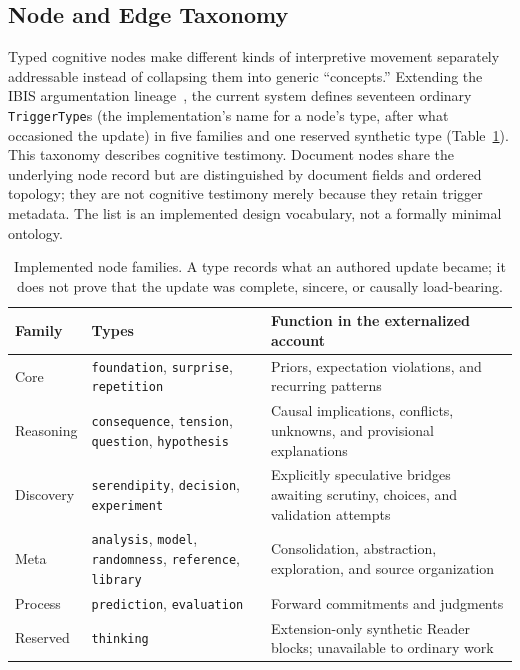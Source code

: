 \subsection{Node and Edge Taxonomy}
\label{sec:node-types}

Typed cognitive nodes make different kinds of interpretive movement separately addressable instead of collapsing them into generic ``concepts.'' Extending the IBIS argumentation lineage~\cite{kunz1970ibis}, the current system defines seventeen ordinary \texttt{TriggerType}s (the implementation's name for a node's type, after what occasioned the update) in five families and one reserved synthetic type (Table~\ref{tab:node-types}). This taxonomy describes cognitive testimony. Document nodes share the underlying node record but are distinguished by document fields and ordered topology; they are not cognitive testimony merely because they retain trigger metadata. The list is an implemented design vocabulary, not a formally minimal ontology.

\begin{table}[htbp]
\centering
\small
\begin{tabularx}{\columnwidth}{l>{\raggedright\arraybackslash}XX}
\toprule
\textbf{Family} & \textbf{Types} & \textbf{Function in the externalized account} \\
\midrule
Core & \texttt{foundation}, \texttt{surprise}, \texttt{repetition} & Priors, expectation violations, and recurring patterns \\
Reasoning & \texttt{consequence}, \texttt{tension}, \texttt{question}, \texttt{hypothesis} & Causal implications, conflicts, unknowns, and provisional explanations \\
Discovery & \texttt{serendipity}, \texttt{decision}, \texttt{experiment} & Explicitly speculative bridges awaiting scrutiny, choices, and validation attempts \\
Meta & \texttt{analysis}, \texttt{model}, \texttt{randomness}, \texttt{reference}, \texttt{library} & Consolidation, abstraction, exploration, and source organization \\
Process & \texttt{prediction}, \texttt{evaluation} & Forward commitments and judgments \\
Reserved & \texttt{thinking} & Extension-only synthetic Reader blocks; unavailable to ordinary work \\
\bottomrule
\end{tabularx}
\caption{Implemented node families. A type records what an authored update became; it does not prove that the update was complete, sincere, or causally load-bearing.}
\label{tab:node-types}
\end{table}


